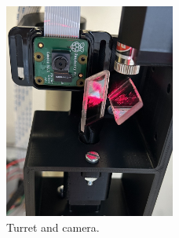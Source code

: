 \begin{figure}
  \centering
  \includegraphics[width=0.5\textwidth]{figures/fotos/turret_and_camera_cropped.jpg}
  \caption{Turret and camera.}
  \label{fig:turret_and_camera}
\end{figure}



\newpage


